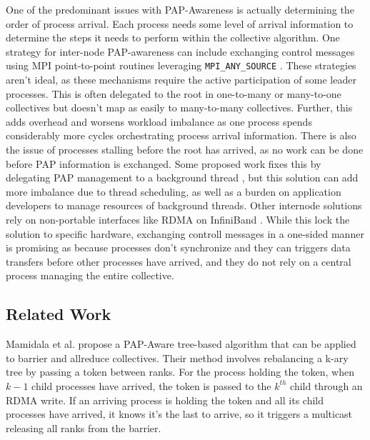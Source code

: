One of the predominant issues with PAP-Awareness is actually determining the order of process arrival.
Each process needs some level of arrival information to determine the steps it needs to perform within the collective algorithm. 
One strategy for inter-node PAP-awareness can include exchanging control messages using MPI point-to-point routines leveraging \texttt{MPI\_ANY\_SOURCE} \cite{Patarasuk2008EffBcastDifProcArr}.
These strategies aren't ideal, as these mechanisms require the active participation of some leader processes.
This is often delegated to the root in one-to-many or many-to-one collectives but doesn't map as easily to many-to-many collectives.
Further, this adds overhead and worsens workload imbalance as one process spends considerably more cycles orchestrating process arrival information.
There is also the issue of processes stalling before the root has arrived, as no work can be done before PAP information is exchanged.
Some proposed work fixes this by delegating PAP management to a background thread \cite{Proficz2018ImprvAllReduceForImbPAP, Proficz2020PAPAwareScatterGather, Proficz2021AllGatherResilientToImbPAP, Faraj2008StudyProcArrivalMPIColl}, but this solution can add more imbalance due to thread scheduling, as well as a burden on application developers to manage resources of background threads.
Other internode solutions rely on non-portable interfaces like RDMA on InfiniBand \cite{Qian2009ProcArrivalSHMA2AIB}.
While this lock the solution to specific hardware, exchanging controll messages in a one-sided manner is promising as because processes don't synchronize and they can triggers data transfers before other processes have arrived, and they do not rely on a central process managing the entire collective. 


\subsection{Related Work}
Mamidala et al. \cite{Mamidala2004BarrierAllreduceIBAdaptive} propose a PAP-Aware tree-based algorithm that can be applied to barrier and allreduce collectives.
Their method involves rebalancing a k-ary tree by passing a token between ranks.
For the process holding the token, when $k-1$ child processes have arrived, the token is passed to the $k^{th}$ child through an RDMA write.
If an arriving process is holding the token and all its child processes have arrived, it knows it's the last to arrive, so it triggers a multicast releasing all ranks from the barrier. 

